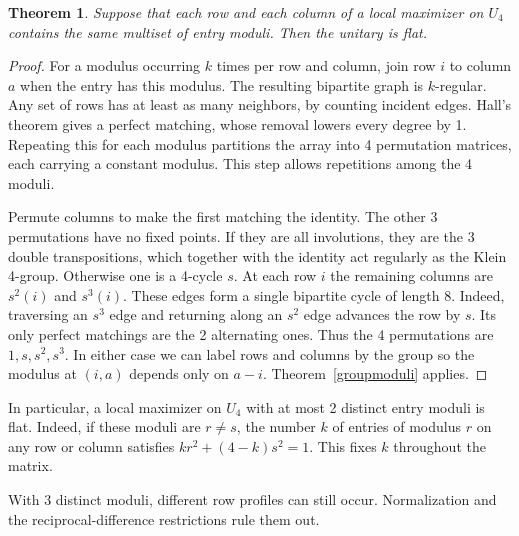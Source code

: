 \documentclass[11pt,a4paper]{article}
\newtheorem{thm}{Theorem}[section]
\begin{document}
\begin{thm}\label{multisetmoduli}
Suppose that each row and each column of a local maximizer on $U_4$
contains the same multiset of entry moduli. Then the unitary is flat.
\end{thm}
\begin{proof}
For a modulus occurring $k$ times per row and column, join row $i$ to
column $a$ when the entry has this modulus. The resulting bipartite
graph is $k$-regular. Any set of rows has at least as many neighbors,
by counting incident edges. Hall's theorem gives a perfect matching,
whose removal lowers every degree by 1. Repeating this for each
modulus partitions the array into 4 permutation matrices, each
carrying a constant modulus. This step allows repetitions among the
4 moduli.

Permute columns to make the first matching the identity. The other
3 permutations have no fixed points. If they are all involutions,
they are the 3 double transpositions, which together with the
identity act regularly as the Klein 4-group. Otherwise one is a
4-cycle $s$. At each row $i$ the remaining columns are $s^2(i)$ and
$s^3(i)$. These edges form a single bipartite cycle of length 8. Indeed,
traversing an $s^3$ edge and returning along an $s^2$ edge advances
the row by $s$. Its only perfect matchings are the 2 alternating
ones. Thus the 4 permutations are $1,s,s^2,s^3$. In either case
we can label rows and columns by the group so the modulus at $(i,a)$
depends only on $a-i$. Theorem~\ref{groupmoduli} applies.
\end{proof}

In particular, a local maximizer on $U_4$ with at most 2 distinct entry
moduli is flat. Indeed, if these moduli are $r\ne s$, the number $k$ of
entries of modulus $r$ on any row or column satisfies
$kr^2+(4-k)s^2=1$. This fixes $k$ throughout the matrix.

With 3 distinct moduli, different row profiles can still occur.
Normalization and the reciprocal-difference restrictions rule them out.
\end{document}
